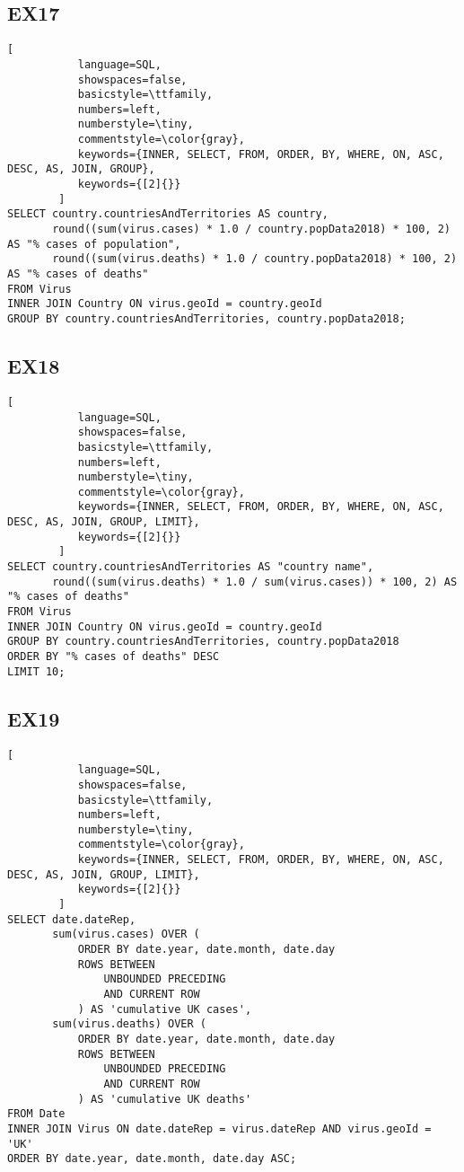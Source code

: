 \documentclass[12pt]{article}
\begin{document}
\subsection*{EX17}

\begin{lstlisting}[
           language=SQL,
           showspaces=false,
           basicstyle=\ttfamily,
           numbers=left,
           numberstyle=\tiny,
           commentstyle=\color{gray},
           keywords={INNER, SELECT, FROM, ORDER, BY, WHERE, ON, ASC, DESC, AS, JOIN, GROUP},
           keywords={[2]{}}
        ]
SELECT country.countriesAndTerritories AS country,
       round((sum(virus.cases) * 1.0 / country.popData2018) * 100, 2) AS "% cases of population",
       round((sum(virus.deaths) * 1.0 / country.popData2018) * 100, 2) AS "% cases of deaths"
FROM Virus
INNER JOIN Country ON virus.geoId = country.geoId
GROUP BY country.countriesAndTerritories, country.popData2018;
\end{lstlisting}

\subsection*{EX18}

\begin{lstlisting}[
           language=SQL,
           showspaces=false,
           basicstyle=\ttfamily,
           numbers=left,
           numberstyle=\tiny,
           commentstyle=\color{gray},
           keywords={INNER, SELECT, FROM, ORDER, BY, WHERE, ON, ASC, DESC, AS, JOIN, GROUP, LIMIT},
           keywords={[2]{}}
        ]
SELECT country.countriesAndTerritories AS "country name",
       round((sum(virus.deaths) * 1.0 / sum(virus.cases)) * 100, 2) AS "% cases of deaths"
FROM Virus
INNER JOIN Country ON virus.geoId = country.geoId
GROUP BY country.countriesAndTerritories, country.popData2018
ORDER BY "% cases of deaths" DESC
LIMIT 10;
\end{lstlisting}

\pagebreak

\subsection*{EX19}

\begin{lstlisting}[
           language=SQL,
           showspaces=false,
           basicstyle=\ttfamily,
           numbers=left,
           numberstyle=\tiny,
           commentstyle=\color{gray},
           keywords={INNER, SELECT, FROM, ORDER, BY, WHERE, ON, ASC, DESC, AS, JOIN, GROUP, LIMIT},
           keywords={[2]{}}
        ]
SELECT date.dateRep,
       sum(virus.cases) OVER (
           ORDER BY date.year, date.month, date.day
           ROWS BETWEEN
               UNBOUNDED PRECEDING
               AND CURRENT ROW
           ) AS 'cumulative UK cases',
       sum(virus.deaths) OVER (
           ORDER BY date.year, date.month, date.day
           ROWS BETWEEN
               UNBOUNDED PRECEDING
               AND CURRENT ROW
           ) AS 'cumulative UK deaths'
FROM Date
INNER JOIN Virus ON date.dateRep = virus.dateRep AND virus.geoId = 'UK'
ORDER BY date.year, date.month, date.day ASC;
\end{lstlisting}
\end{document}
